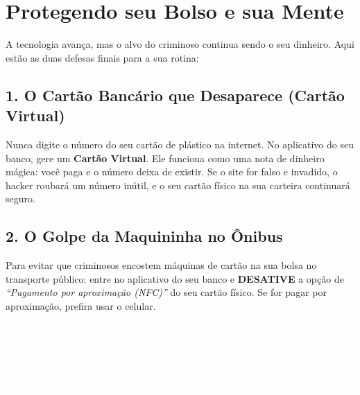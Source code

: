 \section{Protegendo seu Bolso e sua Mente \faCreditCard}

A tecnologia avança, mas o alvo do criminoso continua sendo o seu dinheiro. Aqui estão as duas defesas finais para a sua rotina:

\subsection*{1. O Cartão Bancário que Desaparece (Cartão Virtual)}
Nunca digite o número do seu cartão de plástico na internet. No aplicativo do seu banco, gere um \textbf{Cartão Virtual}. 
Ele funciona como uma nota de dinheiro mágica: você paga e o número deixa de existir. Se o site for falso e invadido, o hacker roubará um número inútil, e o seu cartão físico na sua carteira continuará seguro.

\subsection*{2. O Golpe da Maquininha no Ônibus}
Para evitar que criminosos encostem máquinas de cartão na sua bolsa no transporte público: entre no aplicativo do seu banco e \textbf{DESATIVE} a opção de \textit{\enquote{Pagamento por aproximação (NFC)}} do seu cartão físico. Se for pagar por aproximação, prefira usar o celular.

\vspace{0.5cm}

\begin{tcolorbox}[colback=NordBackground, colframe=red, title=\faBrain\ \textbf{A Regra de Ouro: Engenharia Social}]
	\textcolor{white}{\textbf{O bandido não hackeia o seu celular, ele hackeia a sua mente.}}\\
	\textcolor{white}{Se uma mensagem no WhatsApp causar \textbf{URGÊNCIA} (\enquote{sua conta será bloqueada em 30 min!}) ou \textbf{MEDO} (\enquote{mãe, perdi meu celular, manda um pix.}), \textbf{PARE E RESPIRE}. A pressa é a principal arma deles. Nunca clique em links. Feche a mensagem e ligue para a pessoa para ouvir a voz dela.}
\end{tcolorbox}